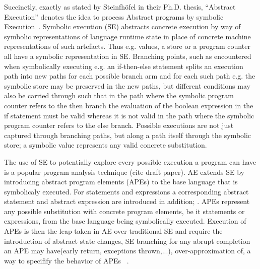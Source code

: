 
Succinctly, exactly as stated by Steinfhöfel in their Ph.D. thesis, “Abstract Execution” denotes the idea to process Abstract programs by symbolic Execution~\cite{steinhoefel-20}.
Symbolic execution (SE) \cite{DBLP:journals/csur/BaldoniCDDF18,DBLP:journals/ac/YangFBCW19} abstracts concrete execution by way of symbolic representations of language runtime
state in place of concrete machine representations of such artefacts.
Thus e.g. values, a store or a program counter all have a symbolic representation in SE.
Branching points, such as encountered when symbolically executing e.g. an if-then-else statement splits an execution path into new paths for each possible branch arm and for each such
path e.g. the symbolic store may be preserved in the new paths, but different conditions may also be carried through such that in the path where the symbolic program counter refers
to the then branch the evaluation of the boolean expression in the if statement must be valid whereas it is not valid in the path where the symbolic program counter refers to the else branch.
Possible executions are not just captured through branching paths, but along a path itself through the symbolic store; a symbolic value represents any valid concrete substitution.

The use of SE to potentially explore every possible execution a program can have is a popular program analysis technique (cite draft paper). AE extends SE by
introducing abstract program elements (APEs) to the base language that is symbolicaly executed.
For statements and expressions a corresponding abstract statement and abstract expression are introduced in addition; .
APEs represent any possible substitution with concrete program elements, be it statements or expressions, from the base language being symbolically executed.
Execution of APEs is then the leap taken in AE over traditional SE and require the introduction of abstract state changes, SE branching for
any abrupt completion an APE may have(early return, exceptions thrown,...), over-approximation of, a way to specifify the behavior of APEs ~\cite{steinhoefel-20}.


